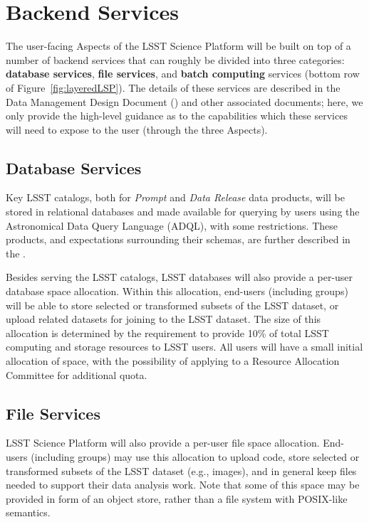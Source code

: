 \section{Backend Services\label{sec:backend}}

The user-facing Aspects of the LSST Science Platform will be built on top of a number of backend services that can roughly be divided into three categories: \textbf{database services}, \textbf{file services}, and \textbf{batch computing} services (bottom row of Figure~\ref{fig:layeredLSP}).
The details of these services are described in the Data Management Design Document () and other associated documents; here, we only provide the high-level guidance as to the capabilities which these services will need to expose to the user (through the three Aspects).

\subsection{Database Services}

Key LSST catalogs, both for \textit{Prompt} and \textit{Data Release} data products, will be stored in relational databases and made available for querying by users using
the Astronomical Data Query Language (ADQL), with some restrictions.
These products, and expectations surrounding their schemas, are further described in the \DPDD.

Besides serving the LSST catalogs, LSST databases will also provide a per-user database space allocation.
Within this allocation, end-users (including groups) will be able to store selected or transformed subsets of the LSST dataset, or upload related datasets for joining to the LSST dataset.
The size of this allocation is determined by the \SRD requirement to provide 10\% of total LSST computing and storage resources to LSST users.
All users will have a small initial allocation of space, with the possibility of applying to a Resource Allocation Committee for additional quota.

\subsection{File Services}

LSST Science Platform will also provide a per-user file space allocation.
End-users (including groups) may use this allocation to upload code, store selected or transformed subsets of the LSST dataset (e.g., images), and in general keep files needed to support their data analysis work.
Note that some of this space may be provided in form of an object store, rather than a file system with POSIX-like semantics.

